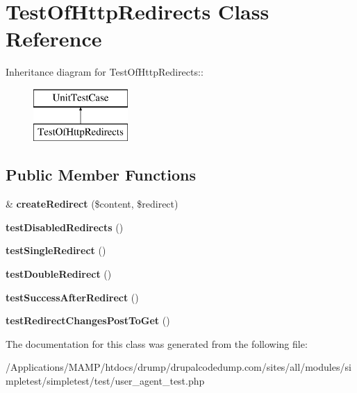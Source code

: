 \hypertarget{class_test_of_http_redirects}{
\section{TestOfHttpRedirects Class Reference}
\label{class_test_of_http_redirects}
}
Inheritance diagram for TestOfHttpRedirects::\begin{figure}[H]
\begin{center}
\leavevmode
\includegraphics[height=2cm]{class_test_of_http_redirects}
\end{center}
\end{figure}
\subsection*{Public Member Functions}
\begin{DoxyCompactItemize}
\item 
\hypertarget{class_test_of_http_redirects_a427556f8b1c7c6bc4029ccc89f60ae7a}{
\& {\bfseries createRedirect} (\$content, \$redirect)}
\label{class_test_of_http_redirects_a427556f8b1c7c6bc4029ccc89f60ae7a}

\item 
\hypertarget{class_test_of_http_redirects_aa5b603b063032fcacda93dc4b516177d}{
{\bfseries testDisabledRedirects} ()}
\label{class_test_of_http_redirects_aa5b603b063032fcacda93dc4b516177d}

\item 
\hypertarget{class_test_of_http_redirects_a647a4afd0e28b0c79a21f3563193b92a}{
{\bfseries testSingleRedirect} ()}
\label{class_test_of_http_redirects_a647a4afd0e28b0c79a21f3563193b92a}

\item 
\hypertarget{class_test_of_http_redirects_adf668ecfad4207686d19944cab07c3ca}{
{\bfseries testDoubleRedirect} ()}
\label{class_test_of_http_redirects_adf668ecfad4207686d19944cab07c3ca}

\item 
\hypertarget{class_test_of_http_redirects_aab26101f3501a7abcfe304b8e42426c0}{
{\bfseries testSuccessAfterRedirect} ()}
\label{class_test_of_http_redirects_aab26101f3501a7abcfe304b8e42426c0}

\item 
\hypertarget{class_test_of_http_redirects_a577132fd8c3760458332a25b80285623}{
{\bfseries testRedirectChangesPostToGet} ()}
\label{class_test_of_http_redirects_a577132fd8c3760458332a25b80285623}

\end{DoxyCompactItemize}


The documentation for this class was generated from the following file:\begin{DoxyCompactItemize}
\item 
/Applications/MAMP/htdocs/drump/drupalcodedump.com/sites/all/modules/simpletest/simpletest/test/user\_\-agent\_\-test.php\end{DoxyCompactItemize}
